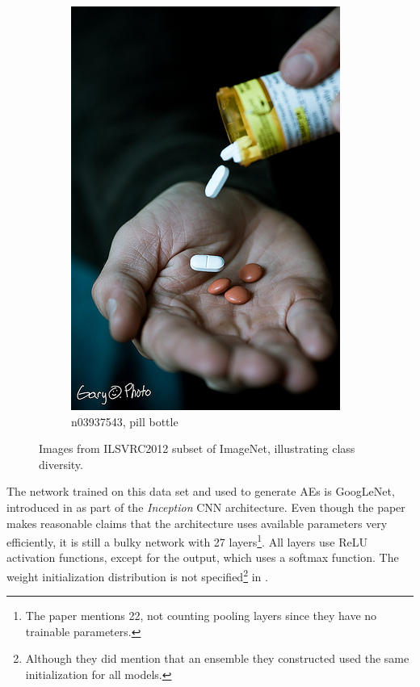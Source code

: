 \documentclass[11pt, a4paper]{article}
\begin{document}
\begin{figure}[h!tb]
\begin{subfigure}[t]{0.30\textwidth}
        \includegraphics[width=\textwidth]{imagenet/examples/n03937543_10012.JPEG}
        \caption{n03937543, pill bottle}
        \label{fig:imagenet-examples-6}
    \end{subfigure}
    \caption[ImageNet class diversity]{Images from ILSVRC2012 subset of ImageNet, illustrating class diversity.}
    \label{fig:imagenet-examples}
\end{figure}

The network trained on this data set and used to generate AEs is GoogLeNet, introduced in \cite{going-deeper-with-convolutions} as part of the \emph{Inception} CNN architecture. Even though the paper makes reasonable claims that the architecture uses available parameters very efficiently, it is still a bulky network with 27 layers\footnote{The paper mentions 22, not counting pooling layers since they have no trainable parameters.}. All layers use ReLU activation functions, except for the output, which uses a softmax function. The weight initialization distribution is not specified\footnote{Although they did mention that an ensemble they constructed used the same initialization for all models.} in \cite{going-deeper-with-convolutions}.
\end{document}
